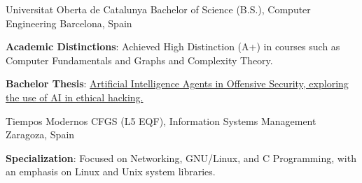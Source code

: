 \documentclass[11pt, a4paper]{awesome-cv}
\begin{document}
%

\vspace{-10pt}

\begin{cventries}
    \cventry
    {Universitat Oberta de Catalunya} %
    {Bachelor of Science (B.S.), Computer Engineering} %
    {Barcelona, Spain} %
    {} %
    {
        \begin{cvitems}
            \item {\textbf{Academic Distinctions}: Achieved High Distinction (A+) in courses such as Computer Fundamentals and Graphs and Complexity Theory.}
            \item {\textbf{Bachelor Thesis}:            
            \href{http://hdl.handle.net/10609/152174}{Artificial Intelligence Agents in Offensive Security, exploring the use of AI in ethical hacking.}
            }
        \end{cvitems}
    }

    \cventry
    {Tiempos Modernos} %
    {CFGS (L5 EQF), Information Systems Management} %
    {Zaragoza, Spain} %
    {} %
    {
        \begin{cvitems}
            \item {\textbf{Specialization}: Focused on Networking, GNU/Linux, and C Programming, with an emphasis on Linux and Unix system libraries.}
        \end{cvitems}
    }
\end{cventries}
\end{document}
